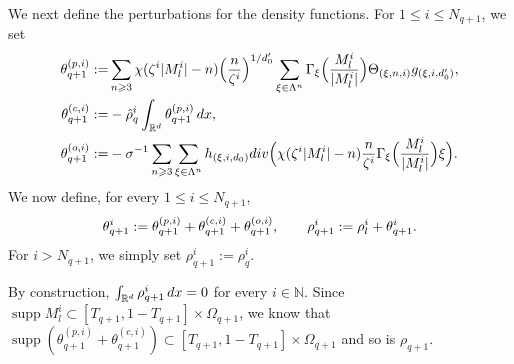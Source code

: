 \documentclass[10pt,a4paper]{amsart}
\numberwithin{equation}{section}
\DeclareMathOperator{\supp}{supp}
\def\dif{{\mathord{{\rm d}}}}
\def\geq{\geqslant}
\def\leq{\leqslant}
\def\div{\mathord{{\rm div}}}
\def\dif{{\mathord{{\rm d}}}}
\def\geq{\geqslant}
\def\leq{\leqslant}
\def\div{\mathord{{\rm div}}}
\begin{document}
We next define the perturbations for the density functions. 
For $1\leq i\leq N_{q+1}$, we set
\begin{align}
\theta_{q+1}^{(p,i)}
:=
&\sum_{n\geq3}
\chi(\zeta^i|M_l^i|-n)
\Bigl(\frac{n}{\zeta^i}\Bigr)^{1/d_0'}
\sum_{\xi\in\Lambda^n}
\Gamma_\xi\Bigl(\frac{M_l^i}{|M_l^i|}\Bigr)
\Theta_{(\xi,n,i)}
g_{(\xi,i,d_0')},
\notag\\
\theta_{q+1}^{(c,i)}
:=
&-\hat{\rho}^i_q
\int_{\mathbb{R}^d}
\theta_{q+1}^{(p,i)}\,\dif x,
\notag\\
\theta_{q+1}^{(o,i)}
:=
&-
\sigma^{-1}
\sum_{n\geq3}
\sum_{\xi\in\Lambda^n}
h_{(\xi,i,d_0)}
\div\Bigl(
\chi(\zeta^i|M_l^i|-n)
\frac{n}{\zeta^i}
\Gamma_\xi\Bigl(\frac{M_l^i}{|M_l^i|}\Bigr)
\xi
\Bigr).
\notag
\end{align}
We now define, for every $1\leq i\leq N_{q+1}$,
\begin{align}
\theta_{q+1}^i
:=
\theta_{q+1}^{(p,i)}
+
\theta_{q+1}^{(c,i)}
+
\theta_{q+1}^{(o,i)},
\qquad
\rho_{q+1}^i
:=
\rho_l^i+\theta_{q+1}^i.
\notag
\end{align}
For $i>N_{q+1}$, we simply set
$
\rho_{q+1}^i:=\rho_q^i.
$

By construction,
$
\int_{\mathbb{R}^d}\rho_{q+1}^i\,\dif x=0
$
for every $i\in\mathbb{N}$.
Since $\supp M_l^i\subset [T_{q+1},1-T_{q+1}]\times\Omega_{q+1}$, we know that $\supp (\theta_{q+1}^{(p,i)}+\theta_{q+1}^{(c,i)})\subset[T_{q+1},1-T_{q+1}]\times\Omega_{q+1}$ and so is $\rho_{q+1}$. 
 
\end{document}
